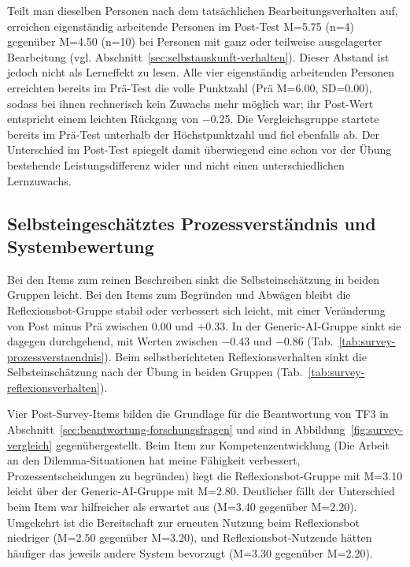 Teilt man dieselben Personen nach dem tatsächlichen Bearbeitungsverhalten auf, erreichen eigenständig
arbeitende Personen im Post-Test M=5.75 (n=4) gegenüber M=4.50 (n=10) bei Personen mit ganz oder
teilweise ausgelagerter Bearbeitung (vgl. Abschnitt~\ref{sec:selbstauskunft-verhalten}). Dieser
Abstand ist jedoch nicht als Lerneffekt zu lesen. Alle vier eigenständig arbeitenden Personen
erreichten bereits im Prä-Test die volle Punktzahl (Prä M=6.00, SD=0.00), sodass bei ihnen rechnerisch
kein Zuwachs mehr möglich war; ihr Post-Wert entspricht einem leichten Rückgang von $-$0.25. Die
Vergleichsgruppe startete bereits im Prä-Test unterhalb der Höchstpunktzahl und fiel ebenfalls ab. Der
Unterschied im Post-Test spiegelt damit überwiegend eine schon vor der Übung bestehende
Leistungsdifferenz wider und nicht einen unterschiedlichen Lernzuwachs.

\subsection*{Selbsteingeschätztes Prozessverständnis und Systembewertung}
Bei den Items zum reinen Beschreiben sinkt die Selbsteinschätzung in beiden Gruppen leicht. Bei den
Items zum Begründen und Abwägen bleibt die Reflexionsbot-Gruppe stabil oder verbessert sich leicht,
mit einer Veränderung von Post minus Prä zwischen 0.00 und $+$0.33. In der Generic-AI-Gruppe sinkt
sie dagegen durchgehend, mit Werten zwischen $-$0.43 und $-$0.86
(Tab.~\ref{tab:survey-prozessverstaendnis}). Beim selbstberichteten Reflexionsverhalten sinkt die
Selbsteinschätzung nach der Übung in beiden Gruppen
(Tab.~\ref{tab:survey-reflexionsverhalten}).

Vier Post-Survey-Items bilden die Grundlage für die Beantwortung von TF3 in
Abschnitt~\ref{sec:beantwortung-forschungsfragen} und sind in
Abbildung~\ref{fig:survey-vergleich} gegenübergestellt. Beim Item zur Kompetenzentwicklung
(\glqq Die Arbeit an den Dilemma-Situationen hat meine Fähigkeit verbessert, Prozessentscheidungen zu
begründen\grqq{}) liegt die Reflexionsbot-Gruppe mit M=3.10 leicht über der Generic-AI-Gruppe mit
M=2.80. Deutlicher fällt der Unterschied beim Item \glqq war hilfreicher als erwartet\grqq{} aus
(M=3.40 gegenüber M=2.20). Umgekehrt ist die Bereitschaft zur erneuten Nutzung beim Reflexionsbot
niedriger (M=2.50 gegenüber M=3.20), und Reflexionsbot-Nutzende hätten häufiger das jeweils andere
System bevorzugt (M=3.30 gegenüber M=2.20).

